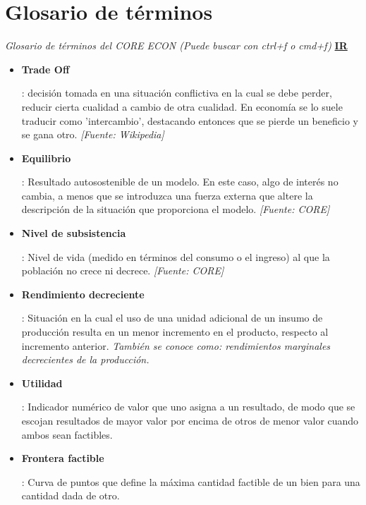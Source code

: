 \section{Glosario de términos}

\textit{Glosario de términos del CORE ECON (Puede buscar con ctrl+f o cmd+f)} \href{https://www.core-econ.org/the-economy/book/es/text/50-02-glossary.html#glossary-econom}{\textbf{IR}}

\begin{itemize}
    
    \item \hypertarget{trade-off}{\textbf{Trade Off}}: decisión tomada en una situación conflictiva en la cual se debe perder, reducir cierta cualidad a cambio de otra cualidad. En economía se lo suele traducir como 'intercambio', destacando entonces que se pierde un beneficio y se gana otro. \textit{[Fuente: Wikipedia]}
    
    \item \hypertarget{equilibrio}{\textbf{Equilibrio}}: Resultado autosostenible de un modelo. En este caso, algo de interés no cambia, a menos que se introduzca una fuerza externa que altere la descripción de la situación que proporciona el modelo. \textit{[Fuente: CORE]}
    
    \item \hypertarget{subsistencia}{\textbf{Nivel de subsistencia}}: Nivel de vida (medido en términos del consumo o el ingreso) al que la población no crece ni decrece. \textit{[Fuente: CORE]}
    
    \item \hypertarget{rendimiento-decreciente}{\textbf{Rendimiento decreciente}}: Situación en la cual el uso de una unidad adicional de un insumo de producción resulta en un menor incremento en el producto, respecto al incremento anterior. \textit{También se conoce como: rendimientos marginales decrecientes de la producción.} 
    
    \item \hypertarget{utilidad}{\textbf{Utilidad}}: Indicador numérico de valor que uno asigna a un resultado, de modo que se escojan resultados de mayor valor por encima de otros de menor valor cuando ambos sean factibles. 
    
    \item \hypertarget{frontera-factible}{\textbf{Frontera factible}}: Curva de puntos que define la máxima cantidad factible de un bien para una cantidad dada de otro. 
    

\end{itemize}
